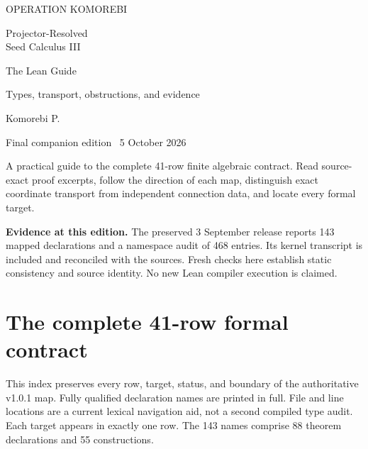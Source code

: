 

\begin{titlepage}
\vspace*{18mm}
{\sffamily\large\color{teal}OPERATION KOMOREBI}\par
\vspace{14mm}
{\fontsize{32}{37}\selectfont Projector-Resolved\\Seed Calculus III}\par
\vspace{8mm}
{\fontsize{25}{29}\selectfont\sffamily\color{teal}The Lean Guide}\par
\vspace{6mm}
{\Large Types, transport, obstructions, and evidence}\par
\vspace{16mm}
{\large Komorebi P.}\par
{Final companion edition \textperiodcentered\ 5 October 2026}\par
\vfill
\begin{minipage}{.94\textwidth}
A practical guide to the complete 41-row finite algebraic contract. Read source-exact proof excerpts, follow the direction of each map, distinguish exact coordinate transport from independent connection data, and locate every formal target.
\medskip

\textbf{Evidence at this edition.} The preserved 3 September release reports 143 mapped declarations and a namespace audit of 468 entries. Its kernel transcript is included and reconciled with the sources. Fresh checks here establish static consistency and source identity. No new Lean compiler execution is claimed.
\end{minipage}
\vspace{10mm}
\end{titlepage}
\tableofcontents
\clearpage







\clearpage
\section{The complete 41-row formal contract}\label{sec:map}
This index preserves every row, target, status, and boundary of the authoritative v1.0.1 map. Fully qualified declaration names are printed in full. File and line locations are a current lexical navigation aid, not a second compiled type audit. Each target appears in exactly one row. The 143 names comprise 88 theorem declarations and 55 constructions.

